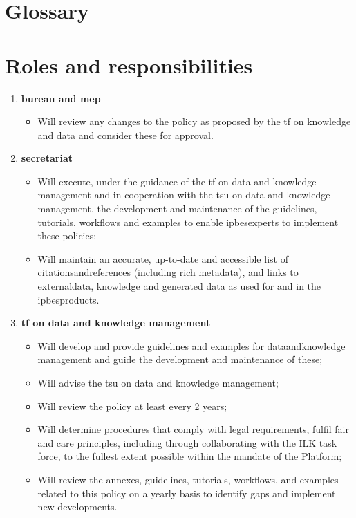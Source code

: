 \documentclass{article}
\begin{document}
\section{Glossary}

\printglossary

\section{Roles and responsibilities}
\label{sec:app_roles}

\begin{enumerate}[label=(\alph*)]
    \item \textbf{\gls{bureau} and \gls{mep}}
    \begin{itemize}
        \item Will review any changes to the policy as proposed by the \gls{tf} on knowledge and data and consider these for approval.
    \end{itemize}

    \item \textbf{\gls{secretariat}}
    \begin{itemize}
        \item Will execute, under the guidance of the \gls{tf} on data and knowledge management and in cooperation with the  \gls{tsu} on data and knowledge management, the development and maintenance of the guidelines, tutorials, \glspl{workflow} and examples to enable \glspl{ipbesexpert} to implement these policies;
        \item Will maintain an accurate, up-to-date and \gls{accessible} list of \gls{citationsandreferences} (including rich metadata), and links to \gls{externaldata}, \gls{knowledge} and generated \gls{data} as used for and in the \glspl{ipbesproduct}.
    \end{itemize}

    \item \textbf{\gls{tf} on data and knowledge management}
    \begin{itemize}
        \item Will develop and provide guidelines and examples for \gls{dataandknowledge} management and guide the development and maintenance of these;
        \item Will advise the \gls{tsu} on data and knowledge management;
        \item Will review the policy at least every 2 years;
        \item Will determine procedures that comply with legal requirements, fulfil \gls{fair} and \gls{care} principles, including through collaborating with the ILK task force, to the fullest extent possible within the mandate of the Platform;
        \item Will review the annexes, guidelines, tutorials, \glspl{workflow}, and examples related to this policy on a yearly basis to identify gaps and implement new developments.
    \end{itemize}


\end{enumerate}
\end{document}

